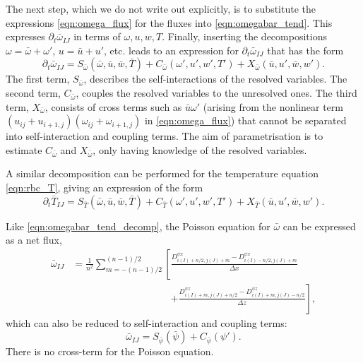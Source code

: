 \documentclass{article}
\begin{document}
The next step, which we do not write out explicitly, is to substitute
the expressions \autoref{eqn:omega_flux} for the fluxes into
\autoref{eqn:omegabar_tend}. This expresses $\partial_t \bar{\omega}_{IJ}$
in terms of $\omega,u,w,T$. Finally, inserting the decompositions
$\omega = \bar{\omega} + \omega'$, $u = \bar{u} + u'$, etc. leads to
an expression for $\partial_t \bar{\omega}_{IJ}$ that has the form
\begin{equation} \label{eqn:omegabar_tend_decomp}
    \partial_t \bar{\omega}_{IJ}
        = S_{\bar{\omega}}(\bar{\omega},\bar{u},\bar{w},\bar{T})
        + C_{\bar{\omega}}(\omega',u',w',T')
        + X_{\bar{\omega}}(\bar{u},u',\bar{w},w').
\end{equation}
The first term, $S_{\bar{\omega}}$, describes the self-interactions of the
resolved variables. The second term, $C_{\bar{\omega}}$, couples the resolved
variables to the unresolved ones. The third term, $X_{\bar{\omega}}$,
consists of cross terms such as $\bar{u}\omega'$ (arising from the nonlinear term
$(u_{ij} + u_{i+1,j})(\omega_{ij} + \omega_{i+1,j})$ in
\autoref{eqn:omega_flux}) that cannot be separated into self-interaction and
coupling terms. The aim of parametrisation is to estimate $C_{\bar{\omega}}$
and $X_{\bar{\omega}}$, only having knowledge of the resolved variables.

A similar decomposition can be performed for the temperature equation
\autoref{eqn:rbc_T}, giving an expression of the form
\begin{equation} \label{eqn:Tbar_tend_decomp}
    \partial_t \bar{T}_{IJ}
        = S_{\bar{T}}(\bar{\omega},\bar{u},\bar{w},\bar{T})
        + C_{\bar{T}}(\omega',u',w',T')
        + X_{\bar{T}}(\bar{u},u',\bar{w},w').
\end{equation}

Like \autoref{eqn:omegabar_tend_decomp}, the Poisson equation for
$\bar{\omega}$ can be expressed as a net flux,
\begin{align*}
    \bar{\omega}_{IJ}
    &= \frac{1}{n^2} \sum_{m=-(n-1)/2}^{(n-1)/2} \left[
        \frac{
            D^{\psi x}_{i(I)+n/2,j(J)+m}
            - D^{\psi x}_{i(I)-n/2,j(J)+m}
        }{\Delta x} \right. \\
    &\phantom{{}=\frac{1}{n^2} \sum_{m=-(n-1)/2}^{(n-1)/2} \left[\right.}
        \left. + \frac{
            D^{\psi z}_{i(I)+m,j(J)+n/2}
            - D^{\psi z}_{i(I)+m,j(J)-n/2}
        }{\Delta z}
        \right],
\end{align*}
which can also be reduced to self-interaction and coupling terms:
\begin{equation} \label{eqn:poisson_decomp}
    \bar{\omega}_{IJ} = S_{\bar{\psi}}(\bar{\psi}) + C_{\bar{\psi}}(\psi').
\end{equation}
There is no cross-term for the Poisson equation.
\end{document}
